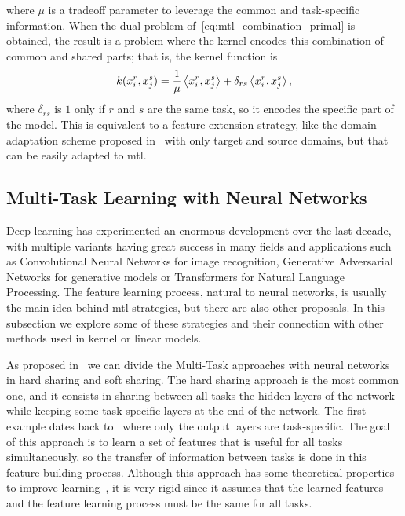 where $\mu$ is a tradeoff parameter to leverage the common and task-specific information.
%
When the dual problem of~\eqref{eq:mtl_combination_primal} is obtained, the result is a problem where the kernel encodes this combination of common and shared parts; that is, the kernel function is
\begin{equation}
    \nonumber
    k(x_i^r, x_j^s) = \frac{1}{\mu} \left\langle x_i^r, x_j^s \right\rangle +  \delta_{rs} \left\langle x_i^r, x_j^s \right\rangle ,
\end{equation}
where $\delta_{rs}$ is $1$ only if $r$ and $s$ are the same task, so it encodes the specific part of the model. This is equivalent to a feature extension strategy, like the domain adaptation scheme proposed in~\cite{Daume07} with only target and source domains, but that can be easily adapted to \acrshort{mtl}.




\subsection{Multi-Task Learning with Neural Networks}\label{subsec:deep_mtl}
Deep learning has experimented an enormous development over the last decade, with multiple variants having great success in many fields and applications such as Convolutional Neural Networks for image recognition, Generative Adversarial Networks for generative models or Transformers for Natural Language Processing. 
The feature learning process, natural to neural networks, is usually the main idea behind \acrshort{mtl} strategies, but there are also other proposals.
In this subsection we explore some of these strategies and their connection with other methods used in kernel or linear models.

As proposed in~\cite{Ruder17a} we can divide the Multi-Task approaches with neural networks in hard sharing and soft sharing.
The hard sharing approach is the most common one, and it consists in sharing between all tasks the hidden layers of the network while keeping some task-specific layers at the end of the network. The first example dates back to~\cite{Caruana97} where only the output layers are task-specific. The goal of this approach is to learn a set of features that is useful for all tasks simultaneously, so the transfer of information between tasks is done in this feature building process. Although this approach has some theoretical properties to improve learning~\citep{baxter2000model}, it is very rigid since it assumes that the learned features and the feature learning process must be the same for all tasks.


